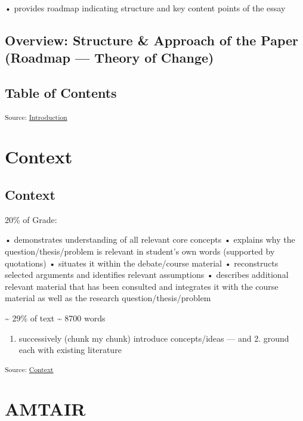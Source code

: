 \documentclass[12pt,a4paper]{report}      %
\providecommand{\tightlist}{%
  \setlength{\itemsep}{0pt}\setlength{\parskip}{0pt}}
\begin{document}
• provides roadmap indicating structure and key content points of the
essay

\section{Overview: Structure \& Approach of the Paper (Roadmap ---
Theory of
Change)}\label{overview-structure-approach-of-the-paper-roadmap-theory-of-change}

\section{Table of Contents}\label{table-of-contents}

\textsubscript{Source:
\href{https://VJMeyer.github.io/submission/chapters/Introduction.qmd.html\#1511baea-a705-44c1-94e9-c6ee72c34c3f}{Introduction}}

\chapter{Context}\label{context}

\section{Context}\label{context-1}

20\% of Grade:

• demonstrates understanding of all relevant core concepts • explains
why the question/thesis/problem is relevant in student's own words
(supported by quotations) • situates it within the debate/course
material • reconstructs selected arguments and identifies relevant
assumptions • describes additional relevant material that has been
consulted and integrates it with the course material as well as the
research question/thesis/problem

\textasciitilde{} 29\% of text \textasciitilde{} 8700 words

\begin{enumerate}
\def\labelenumi{\arabic{enumi}.}
\tightlist
\item
  successively (chunk my chunk) introduce concepts/ideas --- and 2.
  ground each with existing literature
\end{enumerate}

\textsubscript{Source:
\href{https://VJMeyer.github.io/submission/chapters/Context.qmd.html\#2e4caf53-0994-4a2c-beb1-296321648f04}{Context}}

\chapter{AMTAIR}\label{amtair}
\end{document}
